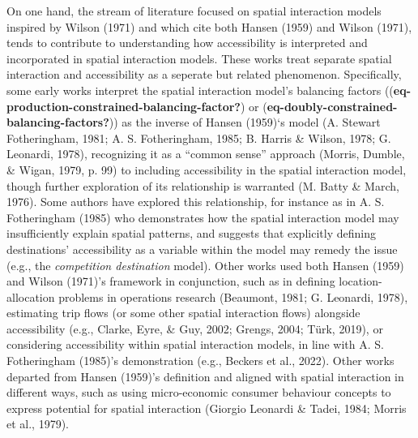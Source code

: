 \documentclass[
11pt, %
oneside, %
english, %
singlespacing, %
]{macthesis} %
\begin{document}
On one hand, the stream of literature focused on spatial interaction models inspired by Wilson (1971) and which cite both Hansen (1959) and Wilson (1971), tends to contribute to understanding how accessibility is interpreted and incorporated in spatial interaction models. These works treat separate spatial interaction and accessibility as a seperate but related phenomenon. Specifically, some early works interpret the spatial interaction model's balancing factors ((\textbf{eq-production-constrained-balancing-factor?}) or (\textbf{eq-doubly-constrained-balancing-factors?})) as the inverse of Hansen (1959)`s model (A. Stewart Fotheringham, 1981; A. S. Fotheringham, 1985; B. Harris \& Wilson, 1978; G. Leonardi, 1978), recognizing it as a ``common sense'' approach (Morris, Dumble, \& Wigan, 1979, p. 99) to including accessibility in the spatial interaction model, though further exploration of its relationship is warranted (M. Batty \& March, 1976). Some authors have explored this relationship, for instance as in A. S. Fotheringham (1985) who demonstrates how the spatial interaction model may insufficiently explain spatial patterns, and suggests that explicitly defining destinations' accessibility as a variable within the model may remedy the issue (e.g., the \emph{competition destination} model). Other works used both Hansen (1959) and Wilson (1971)'s framework in conjunction, such as in defining location-allocation problems in operations research (Beaumont, 1981; G. Leonardi, 1978), estimating trip flows (or some other spatial interaction flows) alongside accessibility (e.g., Clarke, Eyre, \& Guy, 2002; Grengs, 2004; Türk, 2019), or considering accessibility within spatial interaction models, in line with A. S. Fotheringham (1985)'s demonstration (e.g., Beckers et al., 2022). Other works departed from Hansen (1959)'s definition and aligned with spatial interaction in different ways, such as using micro-economic consumer behaviour concepts to express potential for spatial interaction (Giorgio Leonardi \& Tadei, 1984; Morris et al., 1979).
\end{document}
